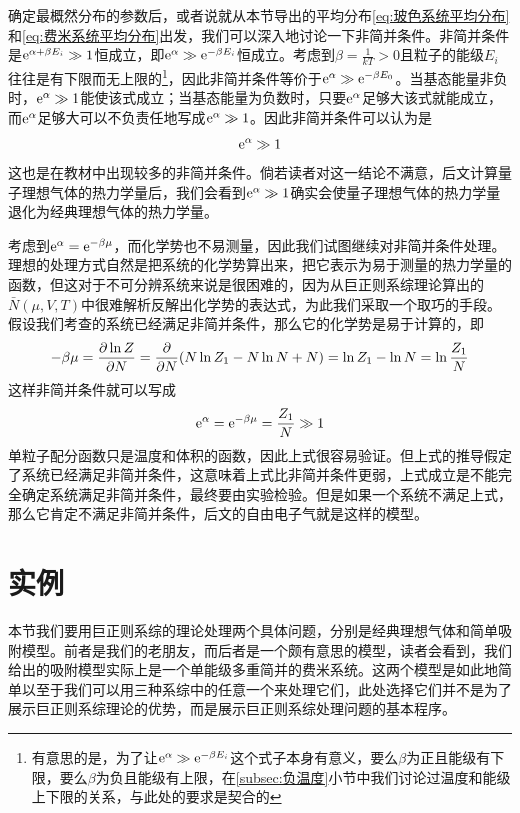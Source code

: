 \documentclass[../../main.tex]{subfiles}
\begin{document}
确定最概然分布的参数后，或者说就从本节导出的平均分布\eqref{eq:玻色系统平均分布}和\eqref{eq:费米系统平均分布}出发，我们可以深入地讨论一下非简并条件。非简并条件是\(\mathrm{e}^{\alpha+\beta E_i}\gg1\)恒成立，即\(\mathrm{e}^{\alpha}\gg\mathrm{e}^{-\beta E_i}\)恒成立。考虑到\(\beta=\frac{1}{kT}>0\)且粒子的能级\(E_i\)往往是有下限而无上限的\footnote{有意思的是，为了让\(\mathrm{e}^{\alpha}\gg\mathrm{e}^{-\beta E_i}\)这个式子本身有意义，要么\(\beta\)为正且能级有下限，要么\(\beta\)为负且能级有上限，在\ref{subsec:负温度}小节中我们讨论过温度和能级上下限的关系，与此处的要求是契合的}，因此非简并条件等价于\(\mathrm{e}^{\alpha}\gg\mathrm{e}^{-\beta E_0}\)。当基态能量非负时，\(\mathrm{e}^{\alpha}\gg1\)能使该式成立；当基态能量为负数时，只要\(\mathrm{e}^{\alpha}\)足够大该式就能成立，而\(\mathrm{e}^{\alpha}\)足够大可以不负责任地写成\(\mathrm{e}^{\alpha}\gg1\)。因此非简并条件可以认为是
\begin{equation}
    \mathrm{e}^{\alpha}\gg 1
\end{equation}
这也是在教材中出现较多的非简并条件。倘若读者对这一结论不满意，后文计算量子理想气体的热力学量后，我们会看到\(\mathrm{e}^{\alpha}\gg1\)确实会使量子理想气体的热力学量退化为经典理想气体的热力学量。

考虑到\(\mathrm{e}^{\alpha}=\mathrm{e}^{-\beta\mu}\)，而化学势也不易测量，因此我们试图继续对非简并条件处理。理想的处理方式自然是把系统的化学势算出来，把它表示为易于测量的热力学量的函数，但这对于不可分辨系统来说是很困难的，因为从巨正则系综理论算出的\(\bar{N}(\mu,V,T)\)中很难解析反解出化学势的表达式，为此我们采取一个取巧的手段。假设我们考查的系统已经满足非简并条件，那么它的化学势是易于计算的，即
\begin{equation}
    -\beta\mu=\pdv{\ln Z}{N}=\pdv{N}(N\ln Z_1-N\ln N+N)=\ln Z_1-\ln N=\ln\frac{Z_1}{N}
\end{equation}
这样非简并条件就可以写成
\begin{equation}
    \mathrm{e}^{\alpha}=\mathrm{e}^{-\beta\mu}=\frac{Z_1}{N}\gg 1
\end{equation}
单粒子配分函数只是温度和体积的函数，因此上式很容易验证。但上式的推导假定了系统已经满足非简并条件，这意味着上式比非简并条件更弱，上式成立是不能完全确定系统满足非简并条件，最终要由实验检验。但是如果一个系统不满足上式，那么它肯定不满足非简并条件，后文的自由电子气就是这样的模型。

\section{实例}
本节我们要用巨正则系综的理论处理两个具体问题，分别是经典理想气体和简单吸附模型。前者是我们的老朋友，而后者是一个颇有意思的模型，读者会看到，我们给出的吸附模型实际上是一个单能级多重简并的费米系统。这两个模型是如此地简单以至于我们可以用三种系综中的任意一个来处理它们，此处选择它们并不是为了展示巨正则系综理论的优势，而是展示巨正则系综处理问题的基本程序。
\end{document}
